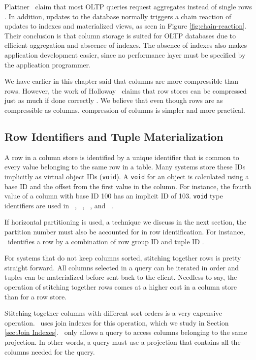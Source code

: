 Plattner \ea~claim that most OLTP queries request aggregates instead of single rows \cite{Plattner2014-fr}. In addition, updates to the database normally triggers a chain reaction of updates to indexes and materialized views, as seen in Figure \ref{fig:chain-reaction}. Their conclusion is that column storage is suited for OLTP databases due to efficient aggregation and abscence of indexes. The absence of indexes also makes application development easier, since no performance layer must be specified by the application programmer.

We have earlier in this chapter said that columns are more compressible than rows. However, the work of Holloway \ea~claims that row stores can be compressed just as much if done correctly \cite{Holloway2008-rr}. We believe that even though rows are as compressible as columns, compression of columns is simpler and more practical.

\subsection{Row Identifiers and Tuple Materialization}
\label{sub:Row Identifiers and Tuple Materialization}
A row in a column store is identified by a unique identifier that is common to every value belonging to the same row in a table. Many systems store these IDs implicitly as virtual object IDs (\texttt{void}). A \texttt{void} for an object is calculated using a base ID and the offset from the first value in the column. For instance, the fourth value of a column with base ID 100 has an implicit ID of 103. \texttt{void} type identifiers are used in \monetdb~\cite{Boncz2002-yj}, \cstore~\cite{Stonebraker2005-qz}, \vertica~\cite{Lamb2012-kg}, and \ibm~\cite{Raman2013-em}.

If horizontal partitioning is used, a technique we discuss in the next section, the partition number must also be accounted for in row identification. For instance, \mssql~identifies a row by a combination of row group ID and tuple ID \cite{Larson2013-mc}.

For systems that do not keep columns sorted, stitching together rows is pretty straight forward. All columns selected in a query can be iterated in order and tuples can be materialized before sent back to the client. Needless to say, the operation of stitching together rows comes at a higher cost in a column store than for a row store.

Stitching together columns with different sort orders is a very expensive operation. \cstore~uses join indexes for this operation, which we study in Section \ref{sec:Join Indexes}. \vertica~only allows a query to access columns belonging to the same projection. In other words, a query must use a projection that contains all the columns needed for the query.

